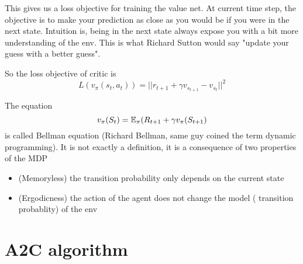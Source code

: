 \documentclass{article}
\begin{document}
This gives us a loss objective for training the value net. At current time
step, the objective is to make your prediction as close as you would be if
you were in the next state. Intuition is, being in the next state always 
expose you with a bit more understanding of the env. This is what Richard Sutton
would say "update your guess with a better guess". 

So the loss objective of critic is
\[
  L(v_{\pi}(s_t, a_t)) = ||r_{t+1} + \gamma v_{s_{t+1}} - v_{s_t}||^2
\]

The equation 
\[
  v_{\pi}(S_t) = \mathbb{E}_{\pi}(R_{t+1} + \gamma v_{\pi}(S_{t+1})
\]
is called Bellman equation (Richard Bellman, same guy coined the term
dynamic programming). It is not exactly a definition, it is a consequence
of two properties of the MDP
\begin{itemize}
  \item (Memoryless) the transition probability only depends on the current
    state
  \item (Ergodicness) the action of the agent does not change the model (
    transition probablity) of the env
\end{itemize}
\newpage

\section{A2C algorithm}
\end{document}
